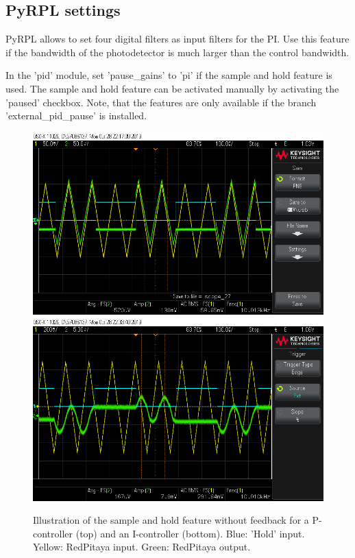 \documentclass[twoside,a4paper]{refart}
\begin{document}
\subsection{PyRPL settings}

PyRPL allows to set four digital filters as input filters for the PI. Use this feature if the bandwidth of the photodetector is much larger than the control bandwidth.

In the 'pid' module, set 'pause\_gains' to 'pi' if the sample and hold feature is used. The sample and hold feature can be activated manually by activating the 'paused' checkbox. Note, that the features are only available if the branch 'external\_pid\_pause' is installed.

\begin{figure}[H]
	\includegraphics[width=\textwidth]{fig/sample_and_hold_P.png}\\
	\includegraphics[width=\textwidth]{fig/sample_and_hold_I.png}
	\caption{Illustration of the sample and hold feature without feedback for a P-controller (top) and an I-controller (bottom). Blue: 'Hold' input. Yellow: RedPitaya input. Green: RedPitaya output. \label{fig:sample_and_hold}}
\end{figure}
\end{document}
